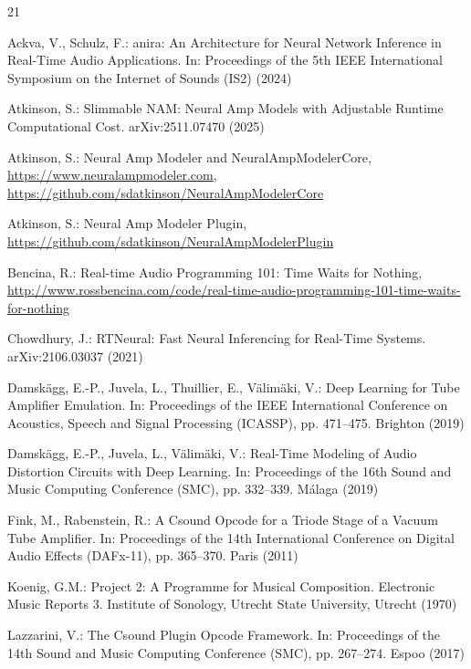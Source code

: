 \documentclass[runningheads,a4paper]{llncs}
\begin{document}
\begin{thebibliography}{21}

 Ackva, V., Schulz, F.: anira: An Architecture
for Neural Network Inference in Real-Time Audio Applications. In:
Proceedings of the 5th IEEE International Symposium on the Internet of
Sounds (IS2) (2024)

 Atkinson, S.: Slimmable NAM: Neural Amp
Models with Adjustable Runtime Computational Cost. arXiv:2511.07470 (2025)

 Atkinson, S.: Neural Amp Modeler and NeuralAmpModelerCore,
\url{https://www.neuralampmodeler.com},
\url{https://github.com/sdatkinson/NeuralAmpModelerCore}

 Atkinson, S.: Neural Amp Modeler Plugin, \url{https://github.com/sdatkinson/NeuralAmpModelerPlugin}

 Bencina, R.: Real-time Audio Programming
101: Time Waits for Nothing,
\url{http://www.rossbencina.com/code/real-time-audio-programming-101-time-waits-for-nothing}

 Chowdhury, J.: RTNeural: Fast Neural
Inferencing for Real-Time Systems. arXiv:2106.03037 (2021)

 Damsk\"agg, E.-P., Juvela, L., Thuillier, E.,
V\"alim\"aki, V.: Deep Learning for Tube Amplifier Emulation. In:
Proceedings of the IEEE International Conference on Acoustics, Speech and
Signal Processing (ICASSP), pp. 471--475. Brighton (2019)

 Damsk\"agg, E.-P., Juvela, L.,
V\"alim\"aki, V.: Real-Time Modeling of Audio Distortion Circuits with
Deep Learning. In: Proceedings of the 16th Sound and Music Computing
Conference (SMC), pp. 332--339. M\'alaga (2019)

 Fink, M., Rabenstein, R.: A Csound Opcode for a
Triode Stage of a Vacuum Tube Amplifier. In: Proceedings of the 14th
International Conference on Digital Audio Effects (DAFx-11), pp. 365--370.
Paris (2011)

 Koenig, G.M.: Project 2: A Programme for
Musical Composition. Electronic Music Reports 3. Institute of Sonology,
Utrecht State University, Utrecht (1970)

 Lazzarini, V.: The Csound Plugin Opcode
Framework. In: Proceedings of the 14th Sound and Music Computing
Conference (SMC), pp. 267--274. Espoo (2017)


\end{thebibliography}
\end{document}
